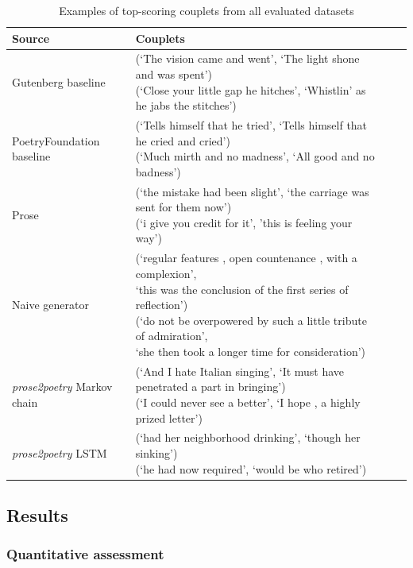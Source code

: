 \documentclass[11pt,a4paper]{article}
\begin{document}
\begin{table}[ht]
\begin{tabular*}{\textwidth}{ll cc}
	\hline\hline
	Source & Couplets \\ [0.5ex]
	\hline\hline
	Gutenberg baseline & \makecell[l] {(`The vision came and went', `The light shone and was spent')\\(`Close your little gap he hitches', `Whistlin' as he jabs the stitches') } \\ [0.5ex]
	\hline
	PoetryFoundation baseline & \makecell[l]{(`Tells himself that he tried', `Tells himself that he cried and cried')\\(`Much mirth and no madness', `All good and no badness') } \\ [0.5ex]
	\hline
	Prose & \makecell[l]{(`the mistake had been slight', `the carriage was sent for them now')\\(`i give you credit for it', 'this is feeling your way')} \\ [0.5ex]
	\hline
	Naive generator & \makecell[l]{(`regular features , open countenance , with a complexion',\\`this was the conclusion of the first series of reflection')\\(`do not be overpowered by such a little tribute of admiration',\\`she then took a longer time for consideration')} \\ [0.5ex]
	\hline
	\textit{prose2poetry} Markov chain & \makecell[l]{(`And I hate Italian singing', `It must have penetrated a part in bringing')\\(`I could never see a better', `I hope , a highly prized letter')} \\ [-1.5ex]
	\hline
	\textit{prose2poetry} LSTM & \makecell[l]{(`had her neighborhood drinking', `though her sinking')\\(`he had now required', `would be who retired')} \\ [0.5ex]
	\hline
\end{tabular*}
\caption{Examples of top-scoring couplets from all evaluated datasets}
\label{table:bestcouplets}
\end{table}

\subsection{Results}
\label{sec:results}
\subsubsection{Quantitative assessment}
\end{document}
